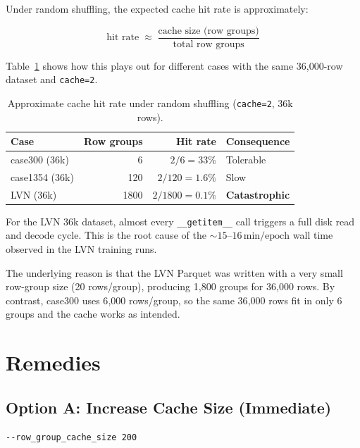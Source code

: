 \documentclass{article}
\begin{document}
Under random shuffling, the expected cache hit rate is approximately:

\begin{equation}
  \text{hit rate}
  \;\approx\;
  \frac{\text{cache size (row groups)}}{\text{total row groups}}
  \label{eq:hitrate}
\end{equation}

Table~\ref{tab:hitrate} shows how this plays out for different cases with
the same 36{,}000-row dataset and \texttt{cache=2}.

\begin{table}[h]
\centering
\caption{Approximate cache hit rate under random shuffling
  (\texttt{cache=2}, 36k rows).}
\label{tab:hitrate}
\begin{tabular}{lrrl}
\toprule
Case & Row groups & Hit rate & Consequence \\
\midrule
case300 (36k)  & 6    & $2/6    = 33\%$ & Tolerable \\
case1354 (36k) & 120  & $2/120  = 1.6\%$ & Slow \\
LVN (36k)      & 1800 & $2/1800 = 0.1\%$ & \textbf{Catastrophic} \\
\bottomrule
\end{tabular}
\end{table}

For the LVN 36k dataset, almost every \texttt{\_\_getitem\_\_} call triggers
a full disk read and decode cycle.  This is the root cause of the
$\sim\!15$--$16\,\mathrm{min/epoch}$ wall time observed in the LVN training
runs.

The underlying reason is that the LVN Parquet was written with a very small
row-group size (20 rows/group), producing 1{,}800 groups for 36{,}000 rows.
By contrast, case300 uses 6{,}000 rows/group, so the same 36{,}000 rows fit
in only 6 groups and the cache works as intended.

\section{Remedies}

\subsection{Option A: Increase Cache Size (Immediate)}

\begin{lstlisting}
--row_group_cache_size 200
\end{lstlisting}
\end{document}
